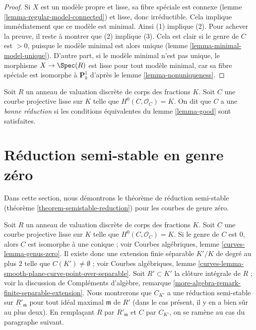 \begin{proof}
Si $X$ est un modèle propre et lisse, sa fibre spéciale est connexe
(lemme \ref{lemma-regular-model-connected}) et lisse, donc irréductible.
Cela implique immédiatement que ce modèle est minimal. Ainsi (1) implique (2).
Pour achever la preuve, il reste à montrer que (2) implique (3). Cela est
clair si le genre de $C$ est $>0$, puisque le modèle minimal est alors
unique (lemme \ref{lemma-minimal-model-unique}). D'autre part, si le modèle
minimal n'est pas unique, le morphisme $X\to\Spec(R)$ est lisse pour tout
modèle minimal, car sa fibre spéciale est isomorphe à $\mathbf{P}^1_k$
d'après le lemme \ref{lemma-nonuniqueness}.
\end{proof}

\begin{definition}
\label{definition-good}
Soit $R$ un anneau de valuation discrète de corps des fractions $K$.
Soit $C$ une courbe projective lisse sur $K$ telle que
$H^0(C,\mathcal{O}_C)=K$. On dit que $C$ a une {\it bonne réduction} si
les conditions équivalentes du lemme \ref{lemma-good} sont satisfaites.
\end{definition}








\section{Réduction semi-stable en genre zéro}
\label{section-semistable-reduction-genus-zero}

\noindent
Dans cette section, nous démontrons le théorème de réduction semi-stable
(théorème \ref{theorem-semistable-reduction}) pour les courbes de genre
zéro.

\medskip\noindent
Soit $R$ un anneau de valuation discrète de corps des fractions $K$.
Soit $C$ une courbe projective lisse sur $K$ telle que
$H^0(C,\mathcal{O}_C)=K$. Si le genre de $C$ est $0$, alors $C$ est
isomorphe à une conique ; voir Courbes algébriques, lemme
\ref{curves-lemma-genus-zero}. Il existe donc une extension finie séparable
$K'/K$ de degré au plus $2$ telle que $C(K') \not = \emptyset$ ; voir Courbes
algébriques, lemme
\ref{curves-lemma-smooth-plane-curve-point-over-separable}. Soit
$R'\subset K'$ la clôture intégrale de $R$ ; voir la discussion de
Compléments d'algèbre, remarque
\ref{more-algebra-remark-finite-separable-extension}. Nous montrerons que
$C_{K'}$ a une réduction semi-stable sur $R'_{\mathfrak m}$ pour tout idéal
maximal $\mathfrak m$ de $R'$ (dans le cas présent, il y en a bien sûr au
plus deux). En remplaçant $R$ par $R'_{\mathfrak m}$ et $C$ par $C_{K'}$,
on se ramène au cas du paragraphe suivant.

